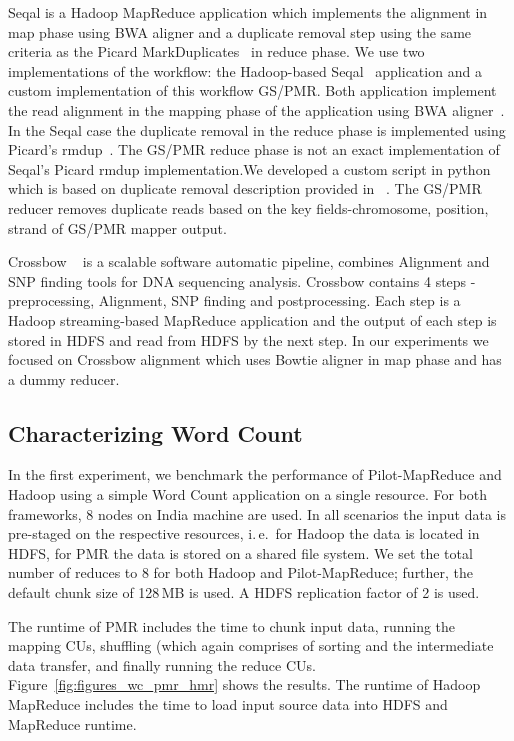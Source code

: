 \documentclass[12pt]{report}
\newcommand{\upp}{\vspace*{-0.5em}}
\newcommand{\pilotmapreduce}{Pilot-MapReduce\xspace}
\begin{document}
Seqal is a Hadoop MapReduce application which implements the alignment
in map phase using BWA aligner and a duplicate removal step using the same criteria as the Picard
MarkDuplicates~\cite{seal2011,seal_2011_mapred} in reduce phase. 
We use two implementations of the workflow: the Hadoop-based 
Seqal~\cite{seal-2011} application and a custom implementation of this workflow 
GS/PMR. Both application implement the read alignment in the mapping phase of 
the application using BWA aligner~\cite{Li:2010:FAL:1741823.1741825}. In the 
Seqal case the duplicate removal in the reduce phase is implemented using  
Picard's rmdup~\cite{picard}. The GS/PMR reduce phase is not an exact implementation of
Seqal's Picard rmdup implementation.We developed a custom script in python
which is based on duplicate removal description provided in ~\cite{seal-2011}. 
The GS/PMR reducer removes duplicate reads based on the key fields-chromosome,
position, strand of GS/PMR mapper output.

Crossbow ~\cite{langmead2009} is a scalable software automatic pipeline, combines Alignment and SNP finding tools for DNA sequencing analysis.
Crossbow contains 4 steps - preprocessing, Alignment, SNP finding and postprocessing.  Each step is a Hadoop streaming-based MapReduce application and the output of each step is stored in HDFS and read from HDFS by the next step.  In our experiments we focused on Crossbow alignment which uses Bowtie aligner in map phase and has a dummy reducer.  


\upp
\subsection{Characterizing Word Count}


In the first experiment, we benchmark the performance of
\pilotmapreduce and Hadoop using a simple Word Count application on a
single resource. For both frameworks, 8 nodes on India machine are
used. In all scenarios the input data is pre-staged on the respective
resources, i.\,e.\ for Hadoop the data is located in HDFS, for PMR the
data is stored on a shared file system. We set the total number of
reduces to 8 for both Hadoop and \pilotmapreduce; further, the default
chunk size of 128\,MB is used. A HDFS replication factor of 2 is used.

The runtime of PMR includes the time to chunk input data, running the
mapping CUs, shuffling (which again comprises of sorting and the
intermediate data transfer, and finally running the reduce CUs.
Figure~\ref{fig:figures_wc_pmr_hmr} shows the results. The runtime of
Hadoop MapReduce includes the time to load input source data into HDFS and
MapReduce runtime.
\end{document}
